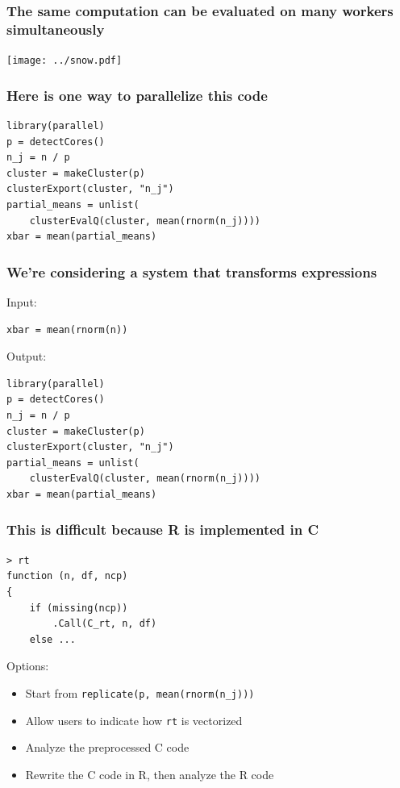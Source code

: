 \documentclass{beamer}
\begin{document}
\begin{frame}

    \frametitle{The same computation can be evaluated on many workers
    simultaneously}

\centerline{\texttt{[image: ../snow.pdf]}}

\end{frame}
\begin{frame}[fragile]

    \frametitle{Here is one way to parallelize this code}

\begin{verbatim}
library(parallel)
p = detectCores()
n_j = n / p
cluster = makeCluster(p)
clusterExport(cluster, "n_j")
partial_means = unlist(
    clusterEvalQ(cluster, mean(rnorm(n_j))))
xbar = mean(partial_means)
\end{verbatim}

\end{frame}
\begin{frame}[fragile]

    \frametitle{We're considering a system that transforms expressions}

    Input:

\begin{verbatim}
xbar = mean(rnorm(n))
\end{verbatim}

    Output:

\begin{verbatim}
library(parallel)
p = detectCores()
n_j = n / p
cluster = makeCluster(p)
clusterExport(cluster, "n_j")
partial_means = unlist(
    clusterEvalQ(cluster, mean(rnorm(n_j))))
xbar = mean(partial_means)
\end{verbatim}

\end{frame}
\begin{frame}[fragile]

    \frametitle{This is difficult because R is implemented in C}

\begin{verbatim}
> rt
function (n, df, ncp)
{
    if (missing(ncp))
        .Call(C_rt, n, df)
    else ...
\end{verbatim}

    Options:

    \begin{itemize}
        \item Start from \texttt{replicate(p, mean(rnorm(n\_j)))}
        \item Allow users to indicate how \texttt{rt} is vectorized
        \item Analyze the preprocessed C code
        \item Rewrite the C code in R, then analyze the R code
    \end{itemize}

\end{frame}
\end{document}
